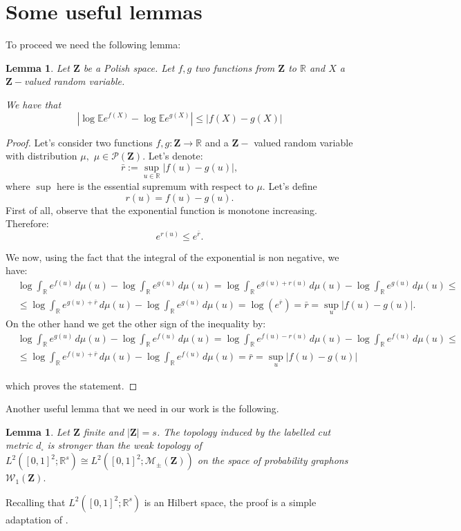 \documentclass[12pt,twoside,a4paper]{article}
\newtheorem{lemma}[theorem]{Lemma}
\def\R{\mathbb{R}}
\newcommand{\Space}{\mathbf{Z}}
\newcommand{\SignedMeas}{\mathcal{M}_{\pm}(\Space)}
\newcommand{\Graphon}{\mathcal{W}_1}
\newcommand{\EE}{\mathbb{E}}
\begin{document}
\section{Some useful lemmas}

To proceed we need the following lemma:
\begin{lemma}\label{lem:BoundLogMomen}
Let $\Space$ be a Polish space. Let $f,g$ two functions from $\Space$ to $\R$ and $X$ a $\Space-$valued random variable. 

We have that
\[|\log\EE e^{f(X)}-\log\EE e^{g(X)}|\leq|f(X)-g(X)|\]
\end{lemma}
\begin{proof}
Let's consider two functions $f,g:\Space \to \mathbb{R}$ and a $\Space-$ valued random variable with distribution $\mu,$ $\mu\in \mathcal{P}(\Space).$ Let's denote:
\[
\bar{r} := \sup_{u\in \mathbb{R}} |f(u) - g(u)|,
\]
where $\sup$ here is the essential supremum with respect to $\mu.$
Let's define
\[
r(u) = f(u) - g(u).
\]
First of all, observe that the exponential function is monotone increasing. Therefore:
\[
e^{r(u)} \leq e^{\bar{r}}.
\]

We now, using the fact that the integral of the exponential is non negative, we have:
\begin{align*}
    &\log \int_{\mathbb{R}} e^{f(u)} \, d\mu(u) - \log \int_{\mathbb{R}} e^{g(u)} \, d\mu(u)=\log \int_{\mathbb{R}} e^{g(u) + r(u)} \, d\mu(u) - \log \int_{\mathbb{R}} e^{g(u)} \, d\mu(u) \leq\\
    &\leq\log \int_{\mathbb{R}} e^{g(u) + \bar{r}} \, d\mu(u) - \log \int_{\mathbb{R}} e^{g(u)} \, d\mu(u)=\log (e^{\bar{r}})= \bar{r} = \sup_{u} |f(u) - g(u)|.
\end{align*}
On the other hand we get the other sign of the inequality by:
\begin{align*}
    &\log \int_{\mathbb{R}} e^{g(u)} \, d\mu(u) - \log \int_{\mathbb{R}} e^{f(u)} \, d\mu(u) =\log \int_{\mathbb{R}} e^{f(u) - r(u)} \, d\mu(u) - \log \int_{\mathbb{R}} e^{f(u)} \, d\mu(u) \leq\\
    &\leq\log \int_{\mathbb{R}} e^{f(u) + \bar{r}} \, d\mu(u) - \log \int_{\mathbb{R}} e^{f(u)} \, d\mu(u) = \bar{r} = \sup_{u} |f(u) - g(u)|
\end{align*}

which proves the statement.
\end{proof}

Another useful lemma that we need in our work is the following.

\begin{lemma}\label{lemm:AppendCutStrongerWeak}
Let $\Space$ finite and $|\Space|=s$. The topology induced by the labelled cut metric $d_{\square}$ is stronger than the weak topology of $L^2([0,1]^2;\R^s)\cong  L^2([0,1]^2;\SignedMeas)$ on the space of probability graphons $\Graphon(\Space).$
\end{lemma}
\proof
Recalling that $L^2([0,1]^2;\R^s)$ is an Hilbert space, the proof is a simple adaptation of \cite[Proposition 3.3]{chatterjee2017large}. 
\endproof
\end{document}
